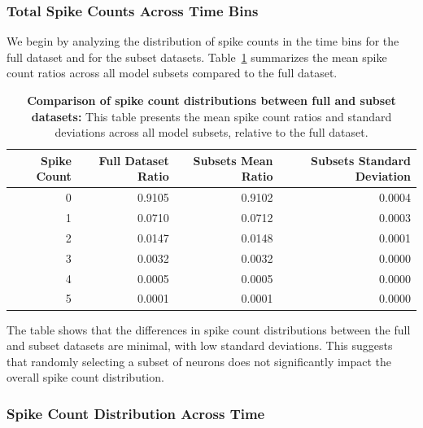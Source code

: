 \subsubsection{Total Spike Counts Across Time Bins}
\label{subsubsec:total_spike_counts_subset}
We begin by analyzing the distribution of spike counts in the time bins for the full dataset and for the subset datasets. Table~\ref{tab:subset_spike_count_distribution} summarizes the mean spike count ratios across all model subsets compared to the full dataset.

\begin{table}
    \centering\footnotesize\sf
    \begin{tabular}{rrrr}
        \toprule
        Spike Count & Full Dataset Ratio & Subsets Mean Ratio & Subsets Standard Deviation \\
        \midrule
        0 & 0.9105 & 0.9102 & 0.0004 \\
        1 & 0.0710 & 0.0712 & 0.0003 \\
        2 & 0.0147 & 0.0148 & 0.0001 \\
        3 & 0.0032 & 0.0032 & 0.0000 \\
        4 & 0.0005 & 0.0005 & 0.0000 \\
        5 & 0.0001 & 0.0001 & 0.0000 \\
        \bottomrule
    \end{tabular}
    \caption{\textbf{Comparison of spike count distributions between full and subset datasets:} This table presents the mean spike count ratios and standard deviations across all model subsets, relative to the full dataset.}
    \label{tab:subset_spike_count_distribution}
\end{table}

The table shows that the differences in spike count distributions between the full and subset datasets are minimal, with low standard deviations. This suggests that randomly selecting a subset of neurons does not significantly impact the overall spike count distribution.

\subsubsection{Spike Count Distribution Across Time}
\label{subsubsec:spike_time_distribution_subset}

